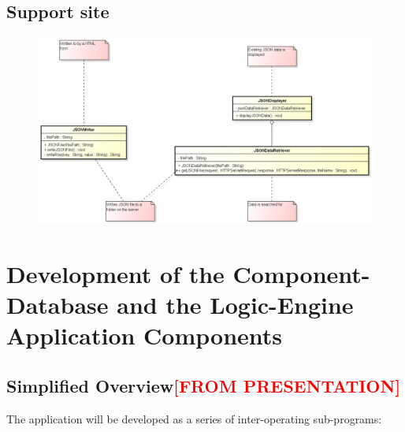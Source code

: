 \subsection{Support site}

\begin{figure}[H]
\centering
\includegraphics[width=5in]{Resources//Design_Diagrams//Class_Backend site java controller.png}
\caption{}
\label{}
\end{figure}

































\iffalse

\section{Development of the Component-Database and the Logic-Engine Application Components}
\label{sec:DevelopmentOfTheComponentDatabaseAndTheLogicEngineApplicationComponents}


\subsection{Simplified Overview\textcolor{red}{[FROM PRESENTATION]}}
\label{sec:Methodology:SimplifiedOverview}
The application will be developed as a series of inter-operating sub-programs:

